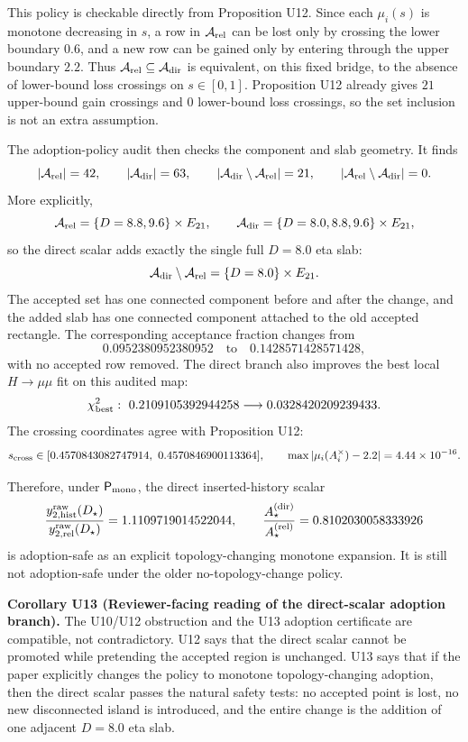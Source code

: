 \documentclass[aps,prd,onecolumn,notitlepage,nofootinbib,superscriptaddress,11pt,floatfix]{revtex4-2}
\begin{document}
This policy is checkable directly from Proposition U12.  Since each \(\mu_i(s)\) is monotone decreasing in \(s\), a row in \(\mathcal A_{\rm rel}\) can be lost only by crossing the lower boundary \(0.6\), and a new row can be gained only by entering through the upper boundary \(2.2\).  Thus \(\mathcal A_{\rm rel}\subseteq\mathcal A_{\rm dir}\) is equivalent, on this fixed bridge, to the absence of lower-bound loss crossings on \(s\in[0,1]\).  Proposition U12 already gives \(21\) upper-bound gain crossings and \(0\) lower-bound loss crossings, so the set inclusion is not an extra assumption.

The adoption-policy audit
then checks the component and slab geometry.  It finds
\[
|\mathcal A_{\rm rel}|=42,\qquad
|\mathcal A_{\rm dir}|=63,\qquad
|\mathcal A_{\rm dir}\setminus\mathcal A_{\rm rel}|=21,
\qquad
|\mathcal A_{\rm rel}\setminus\mathcal A_{\rm dir}|=0.
\]
More explicitly,
\[
\mathcal A_{\rm rel}=\{D=8.8,9.6\}\times E_{21},
\qquad
\mathcal A_{\rm dir}=\{D=8.0,8.8,9.6\}\times E_{21},
\]
so the direct scalar adds exactly the single full \(D=8.0\) eta slab:
\[
\mathcal A_{\rm dir}\setminus\mathcal A_{\rm rel}
=
\{D=8.0\}\times E_{21}.
\]
The accepted set has one connected component before and after the change, and the added slab has one connected component attached to the old accepted rectangle.  The corresponding acceptance fraction changes from
\[
0.0952380952380952
\quad\text{to}\quad
0.1428571428571428,
\]
with no accepted row removed.  The direct branch also improves the best local \(H\to\mu\mu\) fit on this audited map:
\[
\chi^2_{\rm best}:\ 0.2109105392944258
\longrightarrow
0.0328420209239433.
\]
The crossing coordinates agree with Proposition U12:
\[
s_{\rm cross}\in
[0.4570843082747914,\ 0.4570846900113364],
\qquad
\max|\mu_i(A_i^\times)-2.2|=4.44\times10^{-16}.
\]

Therefore, under \(\mathsf P_{\rm mono}\), the direct inserted-history scalar
\[
\frac{y_{2,{\rm hist}}^{\rm raw}(D_\star)}
     {y_{2,{\rm rel}}^{\rm raw}(D_\star)}
=1.1109719014522044,
\qquad
\frac{A_\star^{\rm(dir)}}{A_\star^{\rm(rel)}}
=0.8102030058333926
\]
is adoption-safe as an explicit topology-changing monotone expansion.  It is still not adoption-safe under the older no-topology-change policy.

\medskip\noindent\textbf{Corollary U13 (Reviewer-facing reading of the direct-scalar adoption branch).}
The U10/U12 obstruction and the U13 adoption certificate are compatible, not contradictory.  U12 says that the direct scalar cannot be promoted while pretending the accepted region is unchanged.  U13 says that if the paper explicitly changes the policy to monotone topology-changing adoption, then the direct scalar passes the natural safety tests: no accepted point is lost, no new disconnected island is introduced, and the entire change is the addition of one adjacent \(D=8.0\) eta slab.
\end{document}
